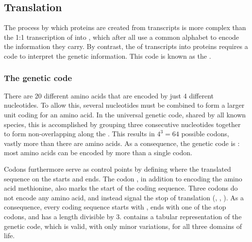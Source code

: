 
\subsection{Translation}

The process by which proteins are created from \mrna transcripts is more complex
than the 1:1 transcription of \dna into \rna, which after all use a common
alphabet to encode the information they carry. By contrast, the
 of \mrna transcripts into proteins requires a code to
interpret the genetic information. This code is known as the .

\subsubsection{The genetic code}

There are \num{20} different amino acids that are encoded by just \num{4}
different nucleotides. To allow this, several nucleotides must be combined to
form a larger unit coding for an amino acid. In the universal genetic code,
shared by all known species, this is accomplished by grouping three consecutive
nucleotides together to form non-overlapping  along the \mrna.
This results in \(4^3 = 64\) possible codons, vastly more than there are amino
acids. As a consequence, the genetic code is : most amino
acids can be encoded by more than a single codon.

Codons furthermore serve as control points by defining where the translated
sequence on the \mrna starts and ends. The codon , in addition to
encoding the amino acid methionine, also marks the start of the coding sequence.
Three codons do not encode any amino acid, and instead signal the stop of
translation (, , ). As a consequence, every
coding sequence starts with , ends with one of the stop codons, and
has a length divisible by \num{3}.  contains a tabular
representation of the genetic code, which is valid, with only minor variations,
for all three domains of life.

